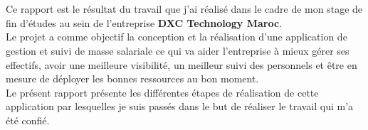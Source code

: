 \titlespacing*{\chapter}{0pt}{1.80in}{0in}
\chapter*{}
\titlespacing*{\chapter}{0pt}{0.45in}{0.3in}%
\vspace{1in}

Ce rapport est le résultat du travail que j'ai réalisé dans le cadre de mon stage de fin d'études au sein de l'entreprise \textbf{DXC Technology Maroc}.\\

Le projet a comme objectif la conception et la réalisation d'une application de gestion et suivi de masse salariale ce qui va aider l'entreprise à mieux gérer ses effectifs, avoir une meilleure visibilité, un meilleur suivi des personnels et être en mesure de déployer les bonnes ressources au bon moment.\\ 

Le présent rapport présente les différentes étapes de réalisation de cette application par lesquelles je suis passés dans le but de réaliser le travail qui m'a été confié.
